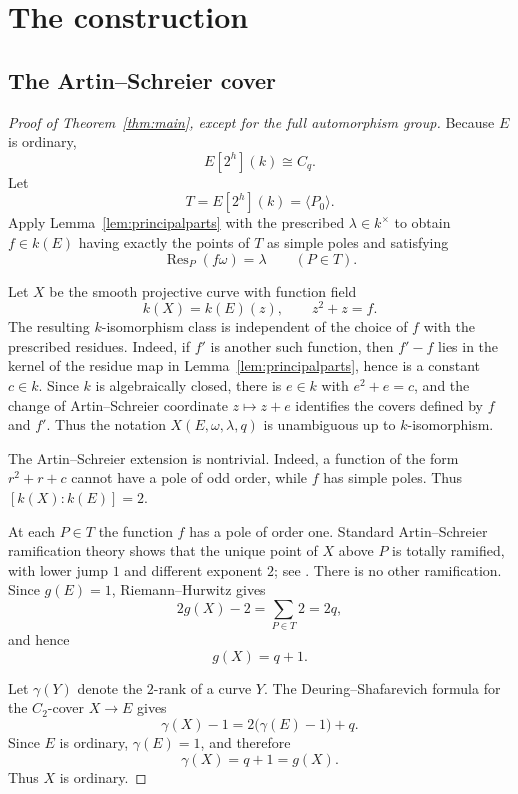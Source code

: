 \documentclass[11pt]{article}
\theoremstyle{remark}
\newcommand{\Res}{\operatorname{Res}}
\begin{document}
\section{The construction}\label{sec:construction}

\subsection{The Artin--Schreier cover}

\begin{proof}[Proof of Theorem~\ref{thm:main}, except for the full automorphism group]
Because $E$ is ordinary,
\[
 E[2^h](k)\cong C_q.
\]
Let
\[
 T=E[2^h](k)=\langle P_0\rangle.
\]
Apply Lemma~\ref{lem:principalparts} with the prescribed
$\lambda\in k^\times$ to obtain $f\in k(E)$ having exactly the points of
$T$ as simple poles and satisfying
\[
 \Res_P(f\omega)=\lambda\qquad(P\in T).
\]

Let $X$ be the smooth projective curve with function field
\begin{equation}\label{eq:AS}
 k(X)=k(E)(z),\qquad z^2+z=f.
\end{equation}
The resulting $k$-isomorphism class is independent of the choice of $f$
with the prescribed residues.  Indeed, if $f'$ is another such function,
then $f'-f$ lies in the kernel of the residue map in
Lemma~\ref{lem:principalparts}, hence is a constant $c\in k$.  Since $k$ is
algebraically closed, there is $e\in k$ with $e^2+e=c$, and the change of
Artin--Schreier coordinate $z\mapsto z+e$ identifies the covers defined by
$f$ and $f'$.  Thus the notation $X(E,\omega,\lambda,q)$ is unambiguous
up to $k$-isomorphism.

The Artin--Schreier extension is nontrivial.  Indeed, a function of the
form $r^2+r+c$ cannot have a pole of odd order, while $f$ has simple
poles.  Thus $[k(X):k(E)]=2$.

At each $P\in T$ the function $f$ has a pole of order one.  Standard
Artin--Schreier ramification theory shows that the unique point of $X$
above $P$ is totally ramified, with lower jump $1$ and different exponent
$2$; see \cite[Proposition~III.7.8]{Stichtenoth}.  There is no other
ramification.  Since $g(E)=1$, Riemann--Hurwitz gives
\[
 2g(X)-2=\sum_{P\in T}2=2q,
\]
and hence
\begin{equation}\label{eq:genus}
 g(X)=q+1.
\end{equation}

Let $\gamma(Y)$ denote the $2$-rank of a curve $Y$.  The
Deuring--Shafarevich formula for the $C_2$-cover $X\to E$ gives
\[
 \gamma(X)-1
 =2\bigl(\gamma(E)-1\bigr)+q.
\]
Since $E$ is ordinary, $\gamma(E)=1$, and therefore
\[
 \gamma(X)=q+1=g(X).
\]
Thus $X$ is ordinary.


\end{proof}
\end{document}
